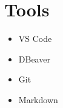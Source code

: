 \documentclass[../cv.tex]{subfiles}
\begin{document}
\begin{minipage}[t]{0.15\linewidth}
	\section{Tools}
	\begin{itemize}[leftmargin=*]
		\item VS Code
		\item DBeaver
		\item Git		
		\item Markdown		
	\end{itemize}
\end{minipage}
\end{document}
